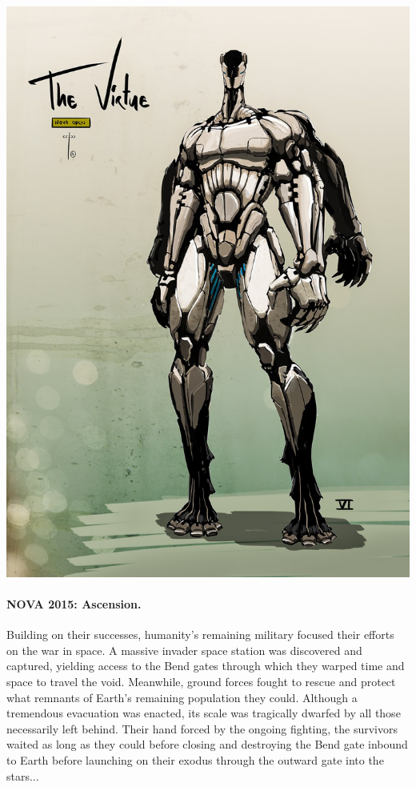 \documentclass{novanarrative}
\begin{document}
\begin{minipage}[c]{0.4\linewidth}%
  \includegraphics[width=\linewidth]{art/characters/virtue-warrior.jpg}
\end{minipage}

\paragraph{NOVA 2015: Ascension.}  Building on their successes,
humanity's remaining military focused their efforts on the war in
space.  A massive invader space station was discovered and captured,
yielding access to the Bend gates through which they warped time and
space to travel the void.  Meanwhile, ground forces fought to rescue
and protect what remnants of Earth's remaining population they could.
Although a tremendous evacuation was enacted, its scale was tragically
dwarfed by all those necessarily left behind.  Their hand forced by
the ongoing fighting, the survivors waited as long as they could
before closing and destroying the Bend gate inbound to Earth before
launching on their exodus through the outward gate into the stars...
\end{document}
